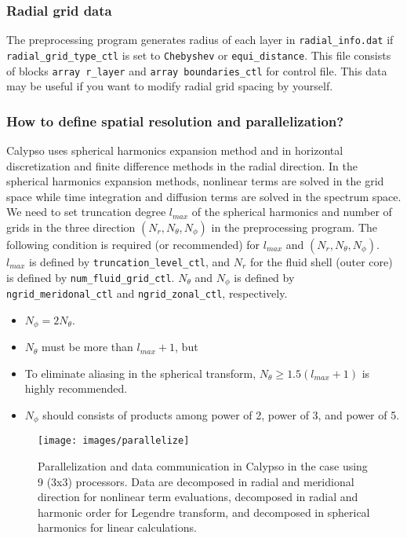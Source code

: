 \subsubsection{Radial grid data}
The preprocessing program generates radius of each layer in \verb|radial_info.dat| if \verb|radial_grid_type_ctl| is set to \verb|Chebyshev| or \verb|equi_distance|. This file consists of blocks \verb|array r_layer| and \verb|array boundaries_ctl| for control file. This data may be useful if you want to modify radial grid spacing by yourself.

\subsubsection{How to define spatial resolution and parallelization?}
  Calypso uses spherical harmonics expansion method and in horizontal discretization and finite difference methods in the radial direction. In the spherical harmonics expansion methods, nonlinear terms are solved in the grid space while time integration and diffusion terms are solved in the spectrum space. We need to set truncation degree $l_{max}$ of the spherical harmonics and number of grids in the three direction $(N_{r}, N_{\theta}, N_{\phi})$ in the preprocessing program. The following condition is required (or recommended) for $l_{max}$ and $(N_{r}, N_{\theta}, N_{\phi})$. $l_{max}$ is defined by \verb|truncation_level_ctl|, and $N_{r}$ for the fluid shell (outer core) is defined by  \verb|num_fluid_grid_ctl|.  $N_{\theta}$ and $N_{\phi}$ is defined by \verb|ngrid_meridonal_ctl| and \verb|ngrid_zonal_ctl|, respectively.
%
\begin{itemize}
\item $N_{\phi} = 2 N_{\theta}$.
\item $N_{\theta}$ must be more than $l_{max}+1$, but
\item To eliminate aliasing in the spherical transform, $N_{\theta} \ge 1.5 \left( l_{max}+1 \right)$ is highly recommended.
\item $N_{\phi}$ should consists of products among power of 2, power of 3, and power of 5.
\end{itemize}
%
%
\begin{figure}[htbp]
\begin{center}
\texttt{[image: images/parallelize]}
\end{center}
\caption{Parallelization and data communication in Calypso in the case using 9 (3x3) processors. Data are decomposed in radial and meridional direction for nonlinear term evaluations, decomposed in radial and harmonic order for Legendre transform, and decomposed in spherical harmonics for linear calculations.}
\label{fig:parallelization}
\end{figure}
